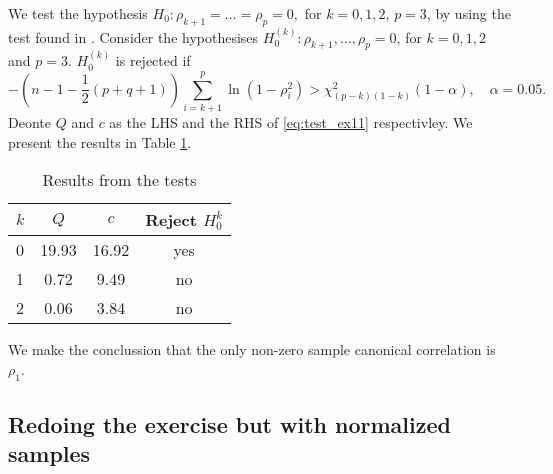 We test the hypothesis $H_0: \rho_{k+1} = \dots = \rho_{p} = 0,$ for $k
= 0,1,2$, $p = 3$, by using the test found in
\cite[p. 565]{book}. Consider the hypothesises $H_{0}^{(k)}:
\rho_{k+1},\dots, \rho_{p} = 0$, for $k = 0,1,2$ and $p =
3$. $H_{0}^{(k)}$ is rejected if 
\begin{equation}\label{eq:test_ex11}
  -\left(n - 1  - \frac{1}{2}(p+q+1)\right) \sum_{i = k+1}^{p} \ln (1 -
  \rho_{i}^{2}) > \chi^{2}_{(p-k)(1-k)}(1-\alpha), \quad \alpha = 0.05.
\end{equation}
Deonte $Q$ and $c$ as the LHS and the RHS of \eqref{eq:test_ex11}
respectivley. We present the results in Table \ref{tab:test_ex11}. 
\begin{table}
  \centering
  \begin{tabular}{l|ccc}
    $k$&$Q$&$c$& Reject $H_{0}^{k}$ \\ \hline
    0 &19.93 &16.92 & yes \\ 
    1 &0.72 &9.49 & no \\ 
    2 &0.06 &3.84 & no  
  \end{tabular}
  \caption{Results from the tests}
  \label{tab:test_ex11}
\end{table}
We make the conclussion that the only non-zero sample canonical
correlation is $\rho_{1}$.
\subsection*{Redoing the exercise but with normalized samples}
\label{sec:redoing-exercise-but}

